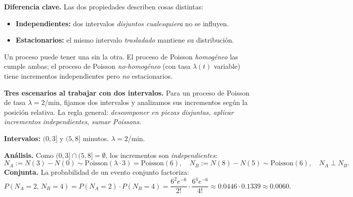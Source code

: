 \documentclass[10pt,a4paper]{article}
\numberwithin{equation}{section}
\newcounter{excount}[section]
\renewcommand{\theexcount}{\thesection.\arabic{excount}}
\newenvironment{ejemplo}[1]{%
  \refstepcounter{excount}%
  \begin{tcolorbox}[exbox, title={Ejemplo \theexcount\ \textperiodcentered\ #1}]%
}{\end{tcolorbox}}
\newenvironment{nota}{\begin{tcolorbox}[notebox]}{\end{tcolorbox}}
\begin{document}
\begin{nota}
  \textbf{Diferencia clave.} Las dos propiedades describen cosas distintas:
  \begin{itemize}
    \item \textbf{Independientes:} dos intervalos \emph{disjuntos cualesquiera} no se influyen.
    \item \textbf{Estacionarios:} el mismo intervalo \emph{trasladado} mantiene su distribuci\'on.
  \end{itemize}
  Un proceso puede tener una sin la otra. El proceso de Poisson \emph{homog\'eneo} las cumple
  ambas; el proceso de Poisson \emph{no-homog\'eneo} (con tasa $\lambda(t)$ variable) tiene
  incrementos independientes pero \emph{no} estacionarios.
\end{nota}

\vspace{6pt}
\textbf{Tres escenarios al trabajar con dos intervalos.}
Para un proceso de Poisson de tasa $\lambda = 2$/min, fijamos dos intervalos y analizamos
sus incrementos seg\'un la posici\'on relativa. La regla general:
\emph{descomponer en piezas disjuntas, aplicar incrementos independientes, sumar Poissons}.

\begin{ejemplo}{Caso 1: intervalos disjuntos}
  \textbf{Intervalos:} $(0, 3]$ y $(5, 8]$ minutos. $\lambda = 2$/min.
  \\[3pt]
  \begin{center}
  \end{center}
  \textbf{An\'alisis.} Como $(0,3] \cap (5,8] = \emptyset$, los incrementos son
  \emph{independientes}:
  \[
    N_A := N(3) - N(0) \sim \mathrm{Poisson}(\lambda \cdot 3) = \mathrm{Poisson}(6),
    \quad N_B := N(8) - N(5) \sim \mathrm{Poisson}(6), \quad N_A \perp N_B.
  \]
  \textbf{Conjunta.} La probabilidad de un evento conjunto factoriza:
  \[
    P(N_A = 2,\, N_B = 4) = P(N_A = 2) \cdot P(N_B = 4)
    = \frac{6^2 e^{-6}}{2!}\cdot\frac{6^4 e^{-6}}{4!} \approx 0.0446 \cdot 0.1339 \approx 0.0060.
  \]
\end{ejemplo}
\end{document}

